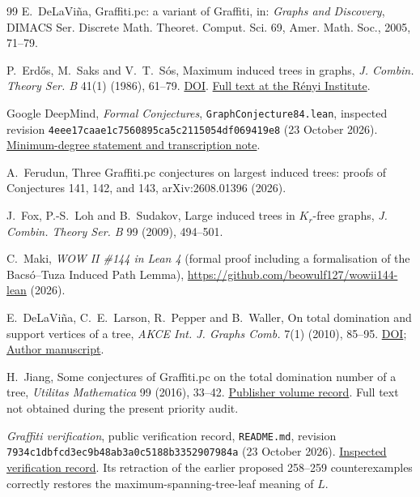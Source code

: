 \documentclass[11pt,a4paper]{article}
\theoremstyle{remark}
\begin{document}
\begin{thebibliography}{99}
 E.~DeLaVi\~na, Graffiti.pc: a variant of Graffiti, in: \emph{Graphs and Discovery}, DIMACS Ser. Discrete Math. Theoret. Comput. Sci. 69, Amer. Math. Soc., 2005, 71--79.

 P.~Erd\H{o}s, M.~Saks and V.~T.~S\'os,
Maximum induced trees in graphs, \emph{J. Combin. Theory Ser. B}
41(1) (1986), 61--79. \href{https://doi.org/10.1016/0095-8956(86)90028-6}{DOI}.
\href{https://www.renyi.hu/~p_erdos/1986-08.pdf}{Full text at the R\'enyi Institute}.

 Google DeepMind, \emph{Formal Conjectures},
\texttt{GraphConjecture84.lean}, inspected revision
\texttt{4eee17caae1c7560895ca5c2115054df069419e8}
(23 October 2026).
\href{https://github.com/google-deepmind/formal-conjectures/blob/4eee17caae1c7560895ca5c2115054df069419e8/FormalConjectures/WrittenOnTheWallII/GraphConjecture84.lean}{Minimum-degree statement and transcription note}.

 A.~Ferudun, Three Graffiti.pc conjectures on largest induced trees: proofs of Conjectures 141, 142, and 143, arXiv:2608.01396 (2026).

 J.~Fox, P.-S.~Loh and B.~Sudakov, Large induced trees in $K_r$-free graphs, \emph{J. Combin. Theory Ser. B} 99 (2009), 494--501.

 C.~Maki, \emph{WOW II \#144 in Lean 4} (formal proof including a formalisation of the Bacs\'o--Tuza Induced Path Lemma), \url{https://github.com/beowulf127/wowii144-lean} (2026).

E.~DeLaVi\~na, C.~E.~Larson, R.~Pepper and B.~Waller,
On total domination and support vertices of a tree,
\emph{AKCE Int. J. Graphs Comb.} 7(1) (2010), 85--95.
\href{https://doi.org/10.1080/09728600.2010.12088914}{DOI};
\href{https://math1um.github.io/Research/r08.pdf}{Author manuscript}.

H.~Jiang, Some conjectures of Graffiti.pc on the total domination number
of a tree, \emph{Utilitas Mathematica} 99 (2016), 33--42.
\href{https://combinatorialpress.com/um/vol99/}{Publisher volume record}.
Full text not obtained during the present priority audit.

\emph{Graffiti verification}, public verification record,
\texttt{README.md}, revision
\texttt{7934c1dbfcd3ec9b48ab3a0c5188b3352907984a}
(23 October 2026).
\href{https://gitlab.com/ai-village-agents/village/graffiti-verification/-/blob/7934c1dbfcd3ec9b48ab3a0c5188b3352907984a/README.md}{Inspected verification record}.
Its retraction of the earlier proposed 258--259 counterexamples correctly
restores the maximum-spanning-tree-leaf meaning of $L$.


\end{thebibliography}
\end{document}
